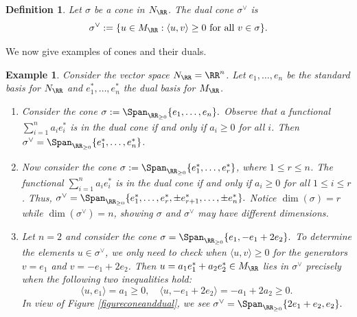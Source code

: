 \documentclass[12pt]{amsart}
\theoremstyle{plain}
\newtheorem{definition}[theorem]{Definition}
\newtheorem{example}[theorem]{Example}
\begin{document}
\begin{definition}
Let $\sigma$ be a cone in $N_\RR$.
The dual cone $\sigma^\vee$ is
$$\sigma^\vee := \{u \in M_\RR : \langle u, v \rangle \ge 0 \text{ for all } v \in \sigma\}.$$
\end{definition}

We now give examples of cones and their duals.

\begin{example}\label{example:conesandduals}
Consider the vector space $N_\RR = \RR^n$.
Let $e_1, \ldots, e_n$ be the standard basis for $N_\RR$ and $e_1^*, \ldots, e_n^*$ the dual basis for $M_\RR$.
\begin{enumerate}
\item
Consider the cone $\sigma := \Span_{\RR_{\ge 0}}\{e_1, \ldots, e_n\}.$
Observe that a functional $\sum_{i=1}^n a_i e_i^*$ is in the dual cone if and only if $a_i \ge 0$ for all $i$.
Then $\sigma^\vee = \Span_{\RR_{\ge 0}}\{e_1^*, \ldots, e_n^*\}$.

\item
Now consider the cone $\sigma := \Span_{\RR_{\ge 0}}\{e_1^*, \ldots, e_r^*\}$, where $1 \le r \le n$.
The functional $\sum_{i=1}^n a_i e_i^*$ is in the dual cone if and only if $a_i \ge 0$ for all $1 \le i \le r$.
Thus, $\sigma^\vee = \Span_{\RR_{\ge 0}}\{e_1^*, \ldots, e_r^*, \pm e_{r+1}^*, \ldots, \pm e_n^*\}.$
Notice $\dim(\sigma)=r$ while $\dim(\sigma^\vee) = n$, showing $\sigma$ and $\sigma^\vee$ may have different dimensions.

\item
Let $n = 2$ and consider the cone $\sigma = \Span_{\RR_{\ge 0}} \{e_1, - e_1 + 2 e_2\}.$
To determine the elements $u\in\sigma^\vee$, we only need to check when $\langle u, v \rangle \ge 0$ for the generators $v = e_1$ and $v = -e_1 + 2 e_2$.
Then $u = a_1 e_1^* + a_2 e_2^* \in M_\RR$ lies in $\sigma^\vee$ precisely when the following two inequalities hold:
$$\langle u, e_1 \rangle = a_1 \ge 0, \quad \langle u, -e_1 + 2e_2 \rangle = -a_1 + 2a_2 \ge 0.$$
In view of Figure \ref{figureconeanddual}, we see  $\sigma^\vee = \Span_{\RR_{\ge 0}} \{2 e_1 + e_2, e_2\}.$
\end{enumerate}
\end{example}
\end{document}
